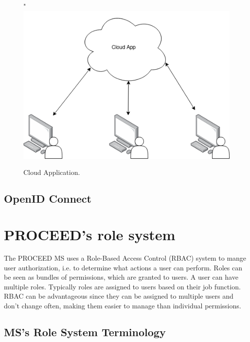 \begin{figure}[H]
    \centering"
    \includegraphics[scale=0.4]{images/basic-cloud-services.drawio.png}
    \caption{Cloud Application.}
    \label{fig:oauth:authcodeflow}
\end{figure}

\subsection{OpenID Connect}
\label{cha:relatedwork:openid}

\section{PROCEED's role system}
\label{cha:relatedwork:proceedroles}

The PROCEED MS uses a Role-Based Access Control (RBAC) system to mange user authorization,
i.e. to determine what actions a user can perform.
Roles can be seen as bundles of permissions, which are granted to users.
A user can have multiple roles.
Typically roles are assigned to users based on their job function.
RBAC can be advantageous since they can be assigned to multiple users and 
don't change often, making them easier to manage than individual permissions.

\subsection{MS's Role System Terminology}
\label{cha:relatedwork:proceedroles:terminology}

